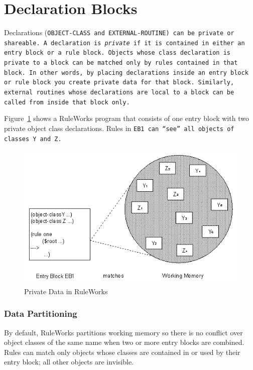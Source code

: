 \section{Declaration Blocks}

Declarations (\tt{OBJECT-CLASS} and \tt{EXTERNAL-ROUTINE}) can be
private or shareable.  A declaration is \emph{private} if it is
contained in either an entry block or a rule block. Objects whose
class declaration is private to a block can be matched only by rules
contained in that block. In other words, by placing declarations
inside an entry block or rule block you create private data for that
block. Similarly, external routines whose declarations are local to a
block can be called from inside that block only.

Figure~\ref{f:5-3} shows a RuleWorks program that consists of one
entry block with two private object class declarations. Rules in
\tt{EB1} can ``see'' all objects of classes \tt{Y} and \tt{Z}.

\begin{figure}[h]
  \centering
  \includegraphics[scale=0.7]{f5-3}
  \caption{Private Data in RuleWorks}
  \label{f:5-3}
\end{figure}

\subsubsection{Data Partitioning}

By default, RuleWorks partitions working memory so there is no
conflict over object classes of the same name when two or more entry
blocks are combined. Rules can match only objects whose classes are
contained in or used by their entry block; all other objects are
invisible.

